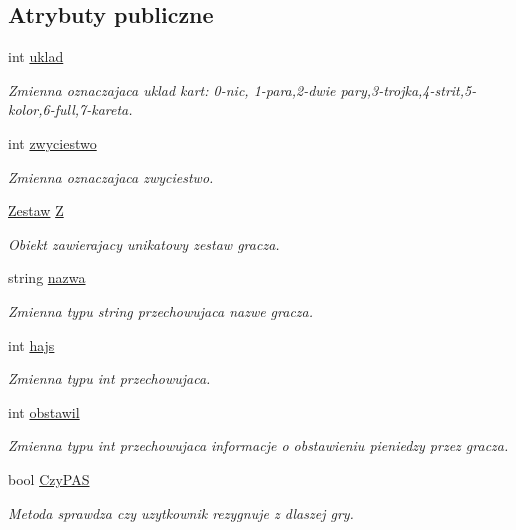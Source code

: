 \subsection*{Atrybuty publiczne}
\begin{DoxyCompactItemize}
\item 
int \hyperlink{class_gracz_a3d23530d268c7825833e48b0f613266f}{uklad}
\begin{DoxyCompactList}\small\item\em Zmienna oznaczajaca uklad kart\-: 0-\/nic, 1-\/para,2-\/dwie pary,3-\/trojka,4-\/strit,5-\/kolor,6-\/full,7-\/kareta. \end{DoxyCompactList}\item 
int \hyperlink{class_gracz_a56490a4d67a3f6950b322c7a1b8c7a30}{zwyciestwo}
\begin{DoxyCompactList}\small\item\em Zmienna oznaczajaca zwyciestwo. \end{DoxyCompactList}\item 
\hyperlink{class_zestaw}{Zestaw} \hyperlink{class_gracz_a958307f187f423a0b1f4fe458af46d90}{Z}
\begin{DoxyCompactList}\small\item\em Obiekt zawierajacy unikatowy zestaw gracza. \end{DoxyCompactList}\item 
string \hyperlink{class_gracz_a4b6cb4abfba854a45d71fe50dea46f81}{nazwa}
\begin{DoxyCompactList}\small\item\em Zmienna typu string przechowujaca nazwe gracza. \end{DoxyCompactList}\item 
int \hyperlink{class_gracz_af1bf45c98144c1018c653284d54638a1}{hajs}
\begin{DoxyCompactList}\small\item\em Zmienna typu int przechowujaca. \end{DoxyCompactList}\item 
int \hyperlink{class_gracz_a05bccdfde37c1d458fced24cd6242528}{obstawil}
\begin{DoxyCompactList}\small\item\em Zmienna typu int przechowujaca informacje o obstawieniu pieniedzy przez gracza. \end{DoxyCompactList}\item 
bool \hyperlink{class_gracz_a21194ebb17e901c39c9c83e699a9e2b7}{Czy\-P\-A\-S}
\begin{DoxyCompactList}\small\item\em Metoda sprawdza czy uzytkownik rezygnuje z dlaszej gry. \end{DoxyCompactList}\end{DoxyCompactItemize}


